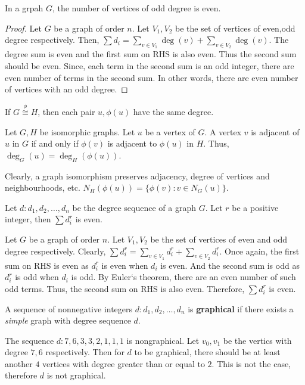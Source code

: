 \begin{corollary}
	In a grpah $G$, the number of vertices of odd degree is even.
\end{corollary}
\begin{proof}
	Let $G$ be a graph of order $n$.
	Let $V_1,V_2$ be the set of vertices of even,odd degree respectively.
	Then, $\sum d_i = \sum_{v \in V_1} \deg(v) + \sum_{v \in V_2} \deg(v)$.
	The degree sum is even and the first sum on RHS is also even. Thus the second sum should be even. Since, each term in the second sum is an odd integer, there are even number of terms in the second sum. In other words, there are even number of vertices with an odd degree.
\end{proof}
\begin{exercise} 
	If $G \overset{\phi}{\cong} H$, then each pair $u,\phi(u)$ have the same degree.
\end{exercise}
Let $G,H$ be isomorphic graphs.
Let $u$ be a vertex of $G$.
A vertex $v$ is adjacent of $u$ in $G$ if and only if $\phi(v)$ is adjacent to $\phi(u)$ in $H$. Thus, $\deg_G(u) = \deg_H(\phi(u))$.

\begin{remark}
	Clearly, a graph isomorphism preserves adjacency, degree of vertices and neighbourhoods, etc.
	$N_H(\phi(u)) = \{ \phi(v) : v \in N_G(u) \}$.
\end{remark}

\begin{exercise}
	Let $d : d_1,d_2,\dots,d_n$ be the degree sequence of a graph $G$.
	Let $r$ be a positive integer, then $\sum d_i^r$ is even.
\end{exercise}
Let $G$ be a graph of order $n$.
Let $V_1,V_2$ be the set of vertices of even and odd degree respectively.
Clearly, $\sum d_i^r = \sum_{v \in V_1} d_i^r + \sum_{v \in V_2} d_i^r$.
Once again, the first sum on RHS is even as $d_i^r$ is even when $d_i$ is even. And the second sum is odd as $d_i^r$ is odd when $d_i$ is odd. By Euler`s theorem, there are an even number of such odd terms. Thus, the second sum on RHS is also even. Therefore, $\sum d_i^r$ is even.

\begin{definition}
	A sequence of nonnegative integers $d : d_1,d_2,\dots,d_n$ is \textbf{graphical} if there exists a \textit{simple} graph with degree sequence $d$.
\end{definition}

\begin{example}
	The sequence $d : 7,6,3,3,2,1,1,1$ is nongraphical. Let $v_0,v_1$ be the vertics with degree $7,6$ respectively. Then for $d$ to be graphical, there should be at least another $4$ vertices with degree greater than or equal to $2$.
	This is not the case, therefore $d$ is not graphical.
\end{example}

